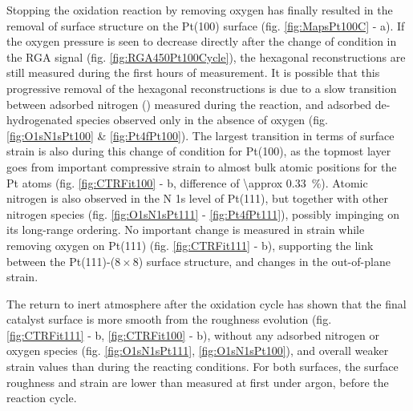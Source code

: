 Stopping the oxidation reaction by removing oxygen has finally resulted in the removal of surface structure on the Pt(100) surface (fig. \ref{fig:MapsPt100C} - a).
If the oxygen pressure is seen to decrease directly after the change of condition in the RGA signal (fig. \ref{fig:RGA450Pt100Cycle}), the hexagonal reconstructions are still measured during the first hours of measurement.
It is possible that this progressive removal of the hexagonal reconstructions is due to a slow transition between adsorbed nitrogen () measured during the reaction, and adsorbed de-hydrogenated species observed only in the absence of oxygen (fig. \ref{fig:O1sN1sPt100} \& \ref{fig:Pt4fPt100}).
The largest transition in terms of surface strain is also during this change of condition for Pt(100), as the topmost layer goes from important compressive strain to almost bulk atomic positions for the Pt atoms (fig. \ref{fig:CTRFit100} - b, difference of \qty{\approx 0.33}{\percent}).
Atomic nitrogen is also observed in the N 1s level of Pt(111), but together with other nitrogen species (fig. \ref{fig:O1sN1sPt111} - \ref{fig:Pt4fPt111}), possibly impinging on its long-range ordering.
No important change is measured in strain while removing oxygen on Pt(111) (fig. \ref{fig:CTRFit111} - b), supporting the link between the Pt(111)-($8\times8$) surface structure, and changes in the out-of-plane strain.


The return to inert atmosphere after the oxidation cycle has shown that the final catalyst surface is more smooth from the roughness evolution (fig. \ref{fig:CTRFit111} - b, \ref{fig:CTRFit100} - b), without any adsorbed nitrogen or oxygen species (fig. \ref{fig:O1sN1sPt111}, \ref{fig:O1sN1sPt100}), and overall weaker strain values than during the reacting conditions.
For both surfaces, the surface roughness and strain are lower than measured at first under argon, before the reaction cycle.

